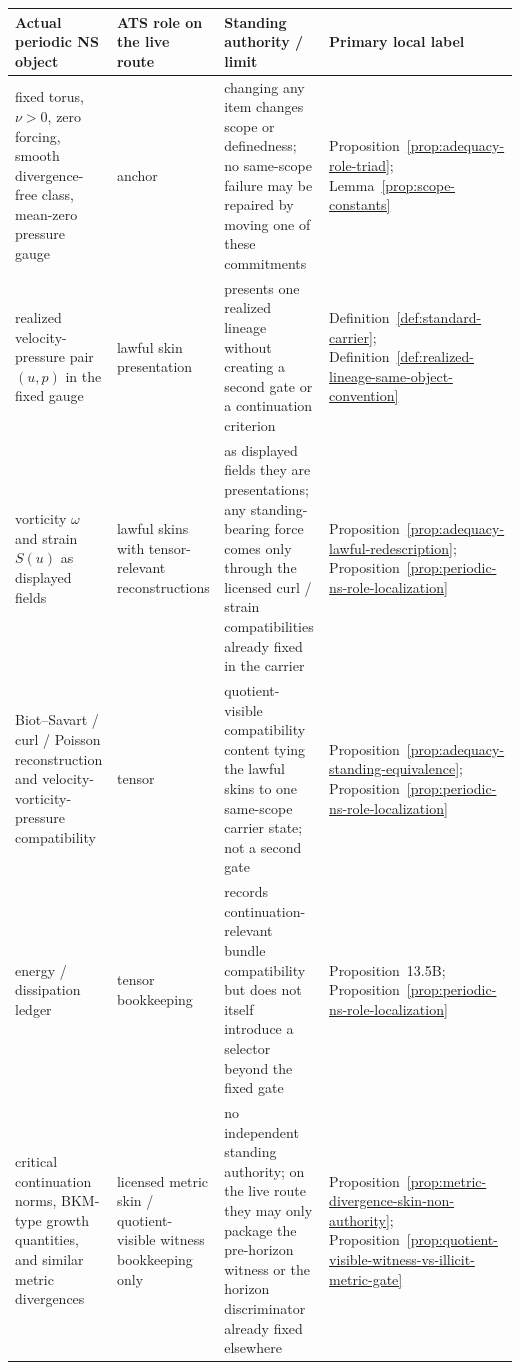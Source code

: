\begin{table}[t]
\centering
\footnotesize
\setlength{\tabcolsep}{4pt}
\renewcommand{\arraystretch}{1.14}
\begin{tabularx}{0.98\textwidth}{@{}L{0.22\textwidth}L{0.18\textwidth}L{0.34\textwidth}Y@{}}
\toprule
\textbf{Actual periodic NS object} & \textbf{ATS role on the live route} & \textbf{Standing authority / limit} & \textbf{Primary local label} \\
\midrule
fixed torus, $\nu>0$, zero forcing, smooth divergence-free class, mean-zero pressure gauge & anchor & changing any item changes scope or definedness; no same-scope failure may be repaired by moving one of these commitments & Proposition~\ref{prop:adequacy-role-triad}; Lemma~\ref{prop:scope-constants} \\
\addlinespace
realized velocity-pressure pair $(u,p)$ in the fixed gauge & lawful skin presentation & presents one realized lineage without creating a second gate or a continuation criterion & Definition~\ref{def:standard-carrier}; Definition~\ref{def:realized-lineage-same-object-convention} \\
\addlinespace
vorticity $\omega$ and strain $S(u)$ as displayed fields & lawful skins with tensor-relevant reconstructions & as displayed fields they are presentations; any standing-bearing force comes only through the licensed curl / strain compatibilities already fixed in the carrier & Proposition~\ref{prop:adequacy-lawful-redescription}; Proposition~\ref{prop:periodic-ns-role-localization} \\
\addlinespace
Biot--Savart / curl / Poisson reconstruction and velocity-vorticity-pressure compatibility & tensor & quotient-visible compatibility content tying the lawful skins to one same-scope carrier state; not a second gate & Proposition~\ref{prop:adequacy-standing-equivalence}; Proposition~\ref{prop:periodic-ns-role-localization} \\
\addlinespace
energy / dissipation ledger & tensor bookkeeping & records continuation-relevant bundle compatibility but does not itself introduce a selector beyond the fixed gate & Proposition~13.5B; Proposition~\ref{prop:periodic-ns-role-localization} \\
\addlinespace
critical continuation norms, BKM-type growth quantities, and similar metric divergences & licensed metric skin / quotient-visible witness bookkeeping only & no independent standing authority; on the live route they may only package the pre-horizon witness or the horizon discriminator already fixed elsewhere & Proposition~\ref{prop:metric-divergence-skin-non-authority}; Proposition~\ref{prop:quotient-visible-witness-vs-illicit-metric-gate} \\

\end{tabularx}
\end{table}
